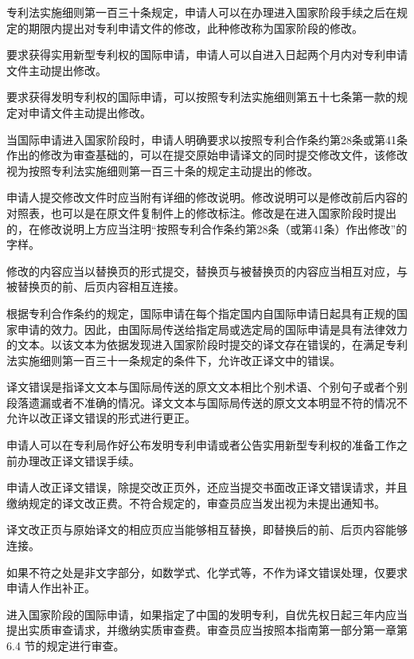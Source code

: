 专利法实施细则第一百三十条规定，申请人可以在办理进入国家阶段手续之后在规定的期限内提出对专利申请文件的修改，此种修改称为国家阶段的修改。

要求获得实用新型专利权的国际申请，申请人可以自进入日起两个月内对专利申请文件主动提出修改。

要求获得发明专利权的国际申请，可以按照专利法实施细则第五十七条第一款的规定对申请文件主动提出修改。

当国际申请进入国家阶段时，申请人明确要求以按照专利合作条约第28条或第41条作出的修改为审查基础的，可以在提交原始申请译文的同时提交修改文件，该修改视为按照专利法实施细则第一百三十条的规定主动提出的修改。

申请人提交修改文件时应当附有详细的修改说明。修改说明可以是修改前后内容的对照表，也可以是在原文件复制件上的修改标注。修改是在进入国家阶段时提出的，在修改说明上方应当注明“按照专利合作条约第28条（或第41条）作出修改”的字样。

修改的内容应当以替换页的形式提交，替换页与被替换页的内容应当相互对应，与被替换页的前、后页内容相互连接。

{\setlength{\parindent}{0.0bp}根据专利合作条约的规定，国际申请在每个指定国内自国际申请日起具有正规的国家申请的效力。因此，由国际局传送给指定局或选定局的国际申请是具有法律效力的文本。以该文本为依据发现进入国家阶段时提交的译文存在错误的，在满足专利法实施细则第一百三十一条规定的条件下，允许改正译文中的错误。\par}

译文错误是指译文文本与国际局传送的原文文本相比个别术语、个别句子或者个别段落遗漏或者不准确的情况。译文文本与国际局传送的原文文本明显不符的情况不允许以改正译文错误的形式进行更正。

申请人可以在专利局作好公布发明专利申请或者公告实用新型专利权的准备工作之前办理改正译文错误手续。

申请人改正译文错误，除提交改正页外，还应当提交书面改正译文错误请求，并且缴纳规定的译文改正费。不符合规定的，审查员应当发出视为未提出通知书。

译文改正页与原始译文的相应页应当能够相互替换，即替换后的前、后页内容能够连接。

如果不符之处是非文字部分，如数学式、化学式等，不作为译文错误处理，仅要求申请人作出补正。

进入国家阶段的国际申请，如果指定了中国的发明专利，自优先权日起三年内应当提出实质审查请求，并缴纳实质审查费。审查员应当按照本指南第一部分第一章第6.4 节的规定进行审查。

